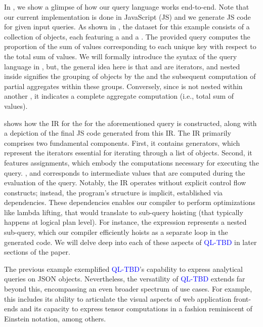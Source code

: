 \documentclass[runningheads]{llncs}
\newcommand{\lang}{\textcolor{blue}{QL-TBD}}
\begin{document}
In , we show a glimpse of how our query language works end-to-end.
Note that our current implementation is done in JavaScript (JS) and we generate JS code for given input queries.
As shown in , the dataset for this example consists of a collection
of objects, each featuring a  and a .
The provided query computes the proportion of the sum of values corresponding to
each unique key with respect to the total sum of values.
We will formally introduce the syntax of the query language in ,
but, the general idea here is that  and  are iterators, and 
 nested inside  signifies the grouping of objects by the
 and the subsequent computation of partial aggregates within these groups.
Conversely, since  is not nested within another , it indicates
a complete aggregate computation (i.e., total sum of values).

 shows how the IR for the  for the aforementioned query is
constructed, along with a depiction of the final JS code generated from this IR.
The IR primarily comprises two fundamental components.
First, it contains generators, which represent the iterators essential for iterating
through a list of objects.
Second, it features assignments, which embody the computations necessary for executing
the query.
,  and  corresponds to intermediate values
that are computed during the evaluation of the query.
Notably, the IR operates without explicit control flow constructs; instead, the
program's structure is implicit, established via dependencies.
These dependencies enables our compiler to perform optimizations like lambda lifting,
that would translate to sub-query hoisting (that typically happens at logical plan level).
For instance, the expression  represents a nested sub-query,
which our compiler efficiently hoists as a separate loop in the generated code.
We will delve deep into each of these aspects of \lang{} in later sections of the paper.

The previous example exemplified \lang{}'s capability to express analytical queries on JSON
objects.
Nevertheless, the versatility of \lang{} extends far beyond this, encompassing an even broader
spectrum of use cases. 
For example, this includes its ability to articulate the visual aspects of web application
front-ends and its capacity to express tensor computations in a fashion reminiscent of
Einstein notation, among others.
\end{document}
